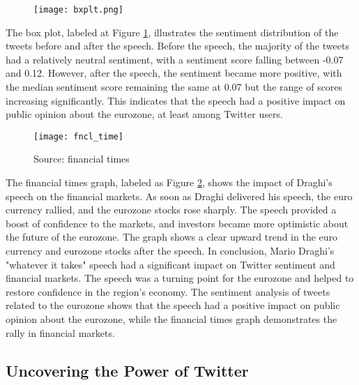 \documentclass[fleqn,10pt]{SelfArx} %
\begin{document}
\begin{figure}[ht]\centering
	\texttt{[image: bxplt.png]}
	\caption{}
	\label{fig:boxplt}
\end{figure}



The box plot, labeled at Figure \ref{fig:boxplt}, illustrates the sentiment distribution of the tweets before and after the speech. Before the speech, the majority of the tweets had a relatively neutral sentiment, with a sentiment score falling between -0.07 and 0.12. However, after the speech, the sentiment became more positive, with the median sentiment score remaining the same at 0.07 but the range of scores increasing significantly. This indicates that the speech had a positive impact on public opinion about the eurozone, at least among Twitter users.


\begin{figure}[ht]\centering
	\texttt{[image: fncl\_time]}
	\caption{Source: financial times}
	\label{fig:fncl_time}
\end{figure}

The financial times graph, labeled as Figure \ref{fig:fncl_time}, shows the impact of Draghi's speech on the financial markets. As soon as Draghi delivered his speech, the euro currency rallied, and the eurozone stocks rose sharply. The speech provided a boost of confidence to the markets, and investors became more optimistic about the future of the eurozone. The graph shows a clear upward trend in the euro currency and eurozone stocks after the speech. In conclusion, Mario Draghi's "whatever it takes" speech had a significant impact on Twitter sentiment and financial markets. The speech was a turning point for the eurozone and helped to restore confidence in the region's economy. The sentiment analysis of tweets related to the eurozone shows that the speech had a positive impact on public opinion about the eurozone, while the financial times graph demonstrates the rally in financial markets.






\subsection{Uncovering the Power of Twitter}
\end{document}
